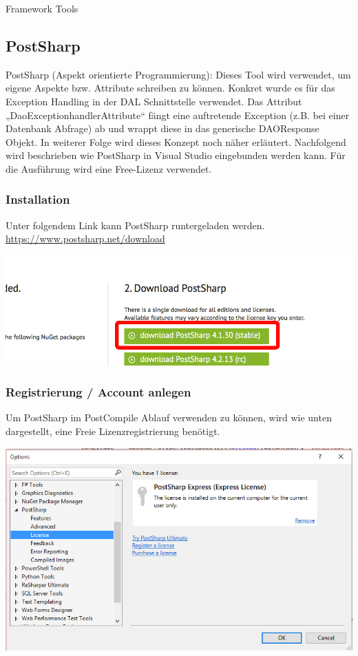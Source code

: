\begin{section}{Framework Tools}

\subsection{PostSharp}
PostSharp (Aspekt orientierte Programmierung):
Dieses Tool wird verwendet, um eigene Aspekte bzw. Attribute schreiben zu können. Konkret wurde es für das Exception Handling in der DAL Schnittstelle verwendet. Das Attribut „DaoExceptionhandlerAttribute“ fängt eine auftretende Exception (z.B. bei einer Datenbank Abfrage) ab und wrappt diese in das generische DAOResponse Objekt. In weiterer Folge wird dieses Konzept noch näher erläutert. Nachfolgend wird beschrieben wie PostSharp in Visual Studio eingebunden werden kann. Für die Ausführung wird eine Free-Lizenz verwendet.

\subsubsection{Installation}
Unter folgendem Link kann PostSharp runtergeladen werden.\newline
\url{https://www.postsharp.net/download}

\includegraphics[angle=0, scale=0.45]{./img/postsharp1.jpg}
\FloatBarrier

\subsubsection{Registrierung / Account anlegen}
Um PostSharp im PostCompile Ablauf verwenden zu können, wird wie unten dargestellt, eine Freie Lizenzregistrierung benötigt.

\includegraphics[angle=0, scale=0.45]{./img/postsharp3.jpg}
\FloatBarrier

		
\end{section}